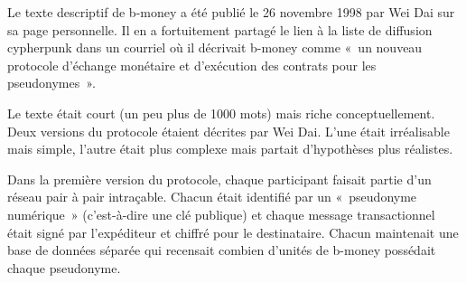 Le texte descriptif de b-money a été publié le 26 novembre 1998 par Wei Dai sur sa page personnelle. Il en a fortuitement partagé le lien à la liste de diffusion cypherpunk dans un courriel où il décrivait b-money comme «~un nouveau protocole d'échange monétaire et d'exécution des contrats pour les pseudonymes~». %

Le texte était court (un peu plus de 1000 mots) mais riche conceptuellement. Deux versions du protocole étaient décrites par Wei Dai. L'une était irréalisable mais simple, l'autre était plus complexe mais partait d'hypothèses plus réalistes.

Dans la première version du protocole, chaque participant faisait partie d'un réseau pair à pair intraçable. Chacun était identifié par un «~pseudonyme numérique~» (c'est-à-dire une clé publique) et chaque message transactionnel était signé par l'expéditeur et chiffré pour le destinataire. Chacun maintenait une base de données séparée qui recensait combien d'unités de b-money possédait chaque pseudonyme.

